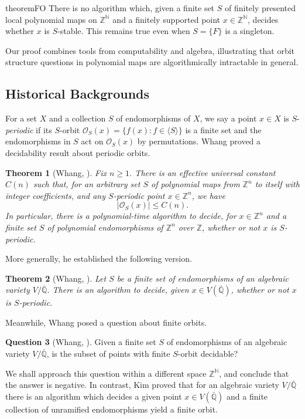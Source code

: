 \documentclass{amsart}
\newtheorem{theorem}{Theorem}[section]
\theoremstyle{definition}
\newtheorem{question}[theorem]{Question}
\theoremstyle{remark}
\numberwithin{equation}{section}
\newcommand{\Z}{\mathbb{Z}}
\newcommand{\N}{\mathbb{N}}
\begin{document}
\begin{restatable}{theorem}{FO}\label{und_fo}
There is no algorithm which, given a finite set \(S\) of finitely presented local polynomial maps on \(\Z^\N\) and a finitely supported point \(x\in\Z^\N\), decides whether \(x\) is \(S\)-stable.
This remains true even when \(S=\{F\}\) is a singleton.
\end{restatable}

Our proof combines tools from computability and algebra, illustrating that orbit structure questions in polynomial maps are algorithmically intractable in general.

\subsection{Historical Backgrounds}
For a set $X$ and a collection $S$ of endomorphisms of $X$, we say a point $x\in X$ is $S$-\textit{periodic} if its $S$-orbit $\mathcal{O}_S(x)=\{f(x):f\in\langle S\rangle\}$ is a finite set and the endomorphisms in $S$ act on $\mathcal{O}_S(x)$ by permutations.
Whang \cite{whang2023} proved a decidability result about periodic orbits.
\begin{theorem}[Whang, \cite{whang2023}]
Fix $n\ge1$.
There is an effective universal constant $C(n)$ such that, for an arbitrary set $S$ of polynomial maps from $\Z^n$ to itself with integer coefficients, and any $S$-periodic point $x\in\Z^n$, we have
\begin{equation*}
|\mathcal{O}_S(x)|\le C(n).
\end{equation*}
In particular, there is a polynomial-time algorithm to decide, for $x\in\Z^n$ and a finite set $S$ of polynomial endomorphisms of $\Z^n$ over $\Z$, whether or not $x$ is $S$-periodic.
\end{theorem}
More generally, he established the following version.
\begin{theorem}[Whang, \cite{whang2023}]
Let $S$ be a finite set of endomorphisms of an algebraic variety $V/\bar{\mathbb{Q}}$.
There is an algorithm to decide, given $x\in V(\bar{\mathbb{Q}})$, whether or not $x$ is $S$-periodic.
\end{theorem}
Meanwhile, Whang posed a question about finite orbits.
\begin{question}[Whang, \cite{whang2023}]
Given a finite set $S$ of endomorphisms of an algebraic variety $V/\bar{\mathbb{Q}}$, is the subset of points with finite $S$-orbit decidable?
\end{question}
We shall approach this question within a different space $\Z^\N$, and conclude that the answer is negative.
In contrast, Kim \cite{kim2025} proved that for an algebraic variety $V/\bar{\mathbb{Q}}$ there is an algorithm which decides a given point $x\in V(\bar{\mathbb{Q}})$ and a finite collection of unramified endomorphisms yield a finite orbit.
\end{document}
